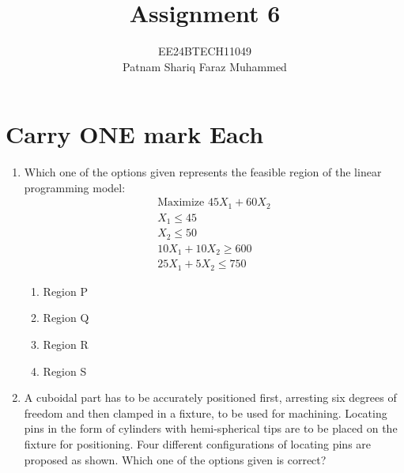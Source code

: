 \documentclass[journal]{IEEEtran}
\numberwithin{equation}{enumi}
\numberwithin{figure}{enumi}
\begin{document}


\title{Assignment 6}
\author{EE24BTECH11049 \\ Patnam Shariq Faraz Muhammed}

{\let\newpage\relax\maketitle}
\section{Carry ONE mark Each}
\begin{enumerate}
    \item 
    Which one of the options given represents the feasible region of the linear programming model:
    \begin{align*}
        \text{Maximize } 45X_1 + 60X_2\\
        X_1 \leq 45\\
        X_2 \leq 50 \\
        10X_1 + 10X_2 \geq 600\\
        25X_1 + 5X_2 \leq 750 
    \end{align*}


    \begin{enumerate}
        \item Region P
        \item Region Q
        \item Region R
        \item Region S
    \end{enumerate}

    \item 
    A cuboidal part has to be accurately positioned first, arresting six degrees of freedom and then clamped in a fixture, to be used for machining. Locating pins in the form of cylinders with hemi-spherical tips are to be placed on the fixture for positioning. Four different configurations of locating pins are proposed as shown. Which one of the options given is correct?



\end{enumerate}
\end{document}
